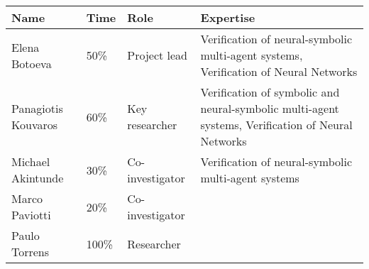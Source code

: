 \documentclass{article}
\begin{document}
\begin{tabular}{lllp{10cm}}
  Name & Time & Role & Expertise\\
  \toprule
  Elena Botoeva & 50\% & Project lead & Verification of neural-symbolic multi-agent systems, Verification of Neural Networks\\
  Panagiotis Kouvaros & 60\% & Key researcher & Verification of symbolic and neural-symbolic multi-agent systems, Verification of Neural Networks\\
  Michael Akintunde & 30\% & Co-investigator & Verification of neural-symbolic multi-agent systems\\
  Marco Paviotti & 20\% & Co-investigator & \\
  Paulo Torrens & 100\% & Researcher &
\end{tabular}
\end{document}
